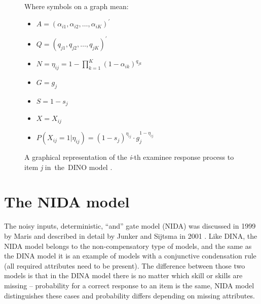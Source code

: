 \documentclass[english]{pwr_wmat_praca_dyplomowa}
\theoremstyle{plain}
\numberwithin{theorem}{chapter}
\theoremstyle{definition}
\numberwithin{theorem}{chapter}
\begin{document}
	\begin{figure}[!ht]
		\centering
		\begin{multicols}{2}
			
			Where symbols on a graph mean:
			\begin{itemize}
				\item $A = (\alpha_{i1}, \alpha_{i2}, \ldots, \alpha_{iK} )^{'}$
				\item $Q = (q_{j1}, q_{j2}, \ldots, q_{jK} )^{'}$
				\item $N = \eta_{ij} = 1- \prod\limits_{k=1}^{K} \left( 1 - \alpha_{ik} \right)^{q_{jk}}$
				\item $G = g_j$
				\item $S = 1-s_j$
				\item $X = X_{ij}$
				\item $P(X_{ij} = 1 | \eta_{ij}) = (1-s_j)^{\eta_{ij}} \cdot g_j^{1-\eta_{ij}}$
			\end{itemize}
		\end{multicols} 
		\caption{A graphical representation of the \textit{i}-th examinee response process to item \textit{j} in~the~DINO model \cite{de_la_torre_2009}.}\label{graph_dino}
	\end{figure}
	
	\section{The NIDA model}
	
	The noisy inputs, deterministic, ``and'' gate model (NIDA) was discussed in 1999 by Maris \cite{nida_maris} and described in detail by Junker and Sijtsma in 2001 \cite{nida_model}. Like DINA, the NIDA model belongs to the non-compensatory type of models, and the same as the DINA model it is an example of models with a conjunctive condensation rule (all required attributes need to be present). The difference between those two models is that in the DINA model there is no matter which skill or skills are missing -- probability for a correct response to an item is the same, NIDA model distinguishes these cases and probability differs depending on missing attributes. 
	
\end{document}
